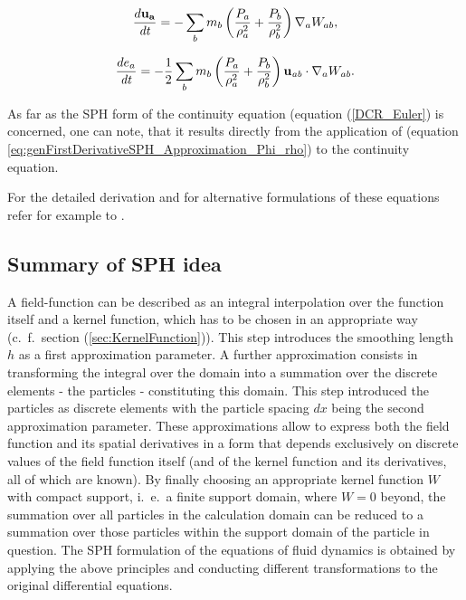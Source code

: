 \documentclass[11pt,a4paper,twoside]{report}
\begin{document}
\begin{equation}
\label{eq:VCR_Euler}
\frac{ d {\bf u_{a}}}{\mathit{dt}}=-\sum_b {m_{b}\left(\frac{P_{a}}{\rho_{a}^{2}}+\frac{P_{b}}{\rho _{b}^{2}}\right)\nabla_{a}W_{ab}},
\end{equation}


\begin{equation}
\label{eq:ECR_Euler}
\frac{de_{a}}{\mathit{dt}}=-\mathit{}\frac{1}{2}\sum_b{m_{b}\left(\frac{P_{a}}{\rho _{a}^{2}}+\frac{P_{b}}{\rho _{b}^{2}}\right){\bf u_{\mathit{ab}}}\cdot\nabla _{a}W_{\mathit{ab}}}.
\end{equation}

As far as the SPH form of the continuity equation (equation (\ref{DCR_Euler}) is concerned, one can note, that it results directly from the application of (equation \ref{eq:genFirstDerivativeSPH_Approximation_Phi_rho}) to the continuity equation.

For the detailed derivation and for alternative formulations of
these equations refer for example to \cite{Monaghan2005, Liu2003}.

\subsection{Summary of SPH idea}
A field-function can be
described as an integral interpolation over the function itself and a kernel
function, which has to be chosen in an appropriate way (c.\ f.\ section (\ref{sec:KernelFunction})). This step introduces the smoothing length $h$ as a first approximation parameter. A further
approximation consists in transforming the integral over the domain into a
summation over the discrete elements - the particles - constituting this domain. This step introduced the particles as discrete elements with the particle spacing $dx$ being the second approximation parameter. 
These approximations allow to express both the field function and its spatial derivatives in a form that depends exclusively on discrete values
of the field function itself (and of the kernel function and its derivatives, 
all of which are known). By finally choosing an appropriate kernel function $W$ with compact support, i.\ e.\ a finite support domain, where $W=0$ beyond, the summation over all particles in the calculation domain can be reduced
to a summation over those particles within the support domain of the particle
in question.
The SPH formulation of the equations of fluid
dynamics is obtained by applying the above principles and conducting different
transformations to the original differential equations. 
\end{document}
